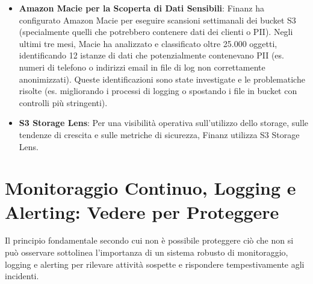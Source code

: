 \begin{itemize}
\begin{itemize}
            \item \texttt{backup-operator-access}: Utilizzato da ruoli IAM specifici per le operazioni di backup e restore, limitando l'accesso solo ai bucket e alle azioni necessarie.
        \end{itemize}
    \item \textbf{Amazon Macie per la Scoperta di Dati Sensibili}: Finanz ha configurato Amazon Macie per eseguire scansioni settimanali dei bucket S3 (specialmente quelli che potrebbero contenere dati dei clienti o PII). Negli ultimi tre mesi, Macie ha analizzato e classificato oltre 25.000 oggetti, identificando 12 istanze di dati che potenzialmente contenevano PII (es. numeri di telefono o indirizzi email in file di log non correttamente anonimizzati). Queste identificazioni sono state investigate e le problematiche risolte (es. migliorando i processi di logging o spostando i file in bucket con controlli più stringenti).
    \item \textbf{S3 Storage Lens}: Per una visibilità operativa sull'utilizzo dello storage, sulle tendenze di crescita e sulle metriche di sicurezza, Finanz utilizza S3 Storage Lens.
\end{itemize}

\section{Monitoraggio Continuo, Logging e Alerting: Vedere per Proteggere}
\label{sec:monitoring-logging_cap2}
Il principio fondamentale secondo cui non è possibile proteggere ciò che non si può osservare sottolinea l'importanza di un sistema robusto di monitoraggio, logging e alerting per rilevare attività sospette e rispondere tempestivamente agli incidenti.

